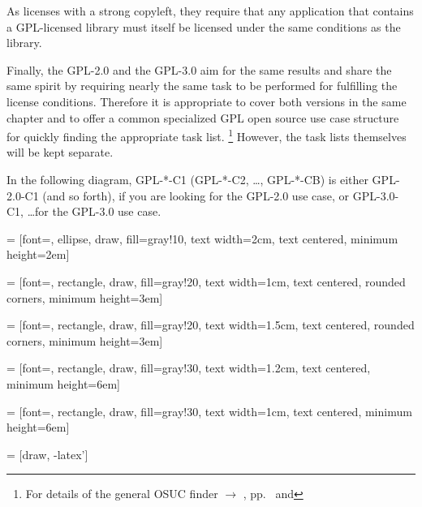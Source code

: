 As licenses with a strong copyleft, they require that any application that
contains a GPL-licensed library must itself be licensed under the same
conditions as the library.
 
Finally, the GPL-2.0 and the GPL-3.0 aim for the same results and share the
same spirit by requiring nearly the same task to be performed for fulfilling the
license conditions.  Therefore it is appropriate to cover both versions in the
same chapter and to offer a common specialized GPL open source use case
structure for quickly finding the appropriate task list.%
  \footnote{For details of the general OSUC finder $\rightarrow$ \oslic,
    pp.\ \pageref{OsucTokens} and \pageref{OsucDefinitionTree}}
However, the task lists themselves will be kept separate.

In the following diagram, GPL-*-C1 (GPL-*-C2, \ldots, GPL-*-CB) is either
GPL-2.0-C1 (and so forth), if you are looking for the GPL-2.0 use case, or
GPL-3.0-C1, \ldots for the GPL-3.0 use case.

 = [font=\scriptsize, ellipse, draw, fill=gray!10, 
    text width=2cm, text centered, minimum height=2em]

 = [font=\tiny, rectangle, draw, fill=gray!20, 
    text width=1cm, text centered, rounded corners, minimum height=3em]

 = [font=\tiny, rectangle, draw, fill=gray!20, 
    text width=1.5cm, text centered, rounded corners, minimum height=3em]
    
 = [font=\tiny, rectangle, draw, fill=gray!30, 
    text width=1.2cm, text centered, minimum height=6em]

 = [font=\tiny, rectangle, draw, fill=gray!30, 
    text width=1cm, text centered, minimum height=6em]


 = [draw, -latex']


